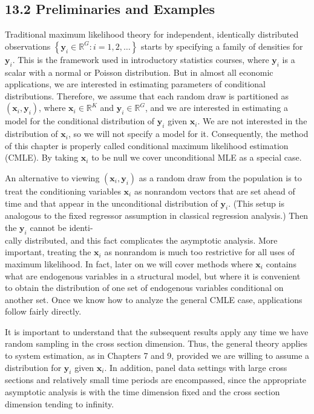 \documentclass[10pt]{article}
\begin{document}
\subsection*{13.2 Preliminaries and Examples}
Traditional maximum likelihood theory for independent, identically distributed observations $\left\{\mathbf{y}_{i} \in \mathbb{R}^{G}: i=1,2, \ldots\right\}$ starts by specifying a family of densities for $\mathbf{y}_{i}$. This is the framework used in introductory statistics courses, where $\mathbf{y}_{i}$ is a scalar with a normal or Poisson distribution. But in almost all economic applications, we are interested in estimating parameters of conditional distributions. Therefore, we assume that each random draw is partitioned as $\left(\mathbf{x}_{i}, \mathbf{y}_{i}\right)$, where $\mathbf{x}_{i} \in \mathbb{R}^{K}$ and $\mathbf{y}_{i} \in \mathbb{R}^{G}$, and we are interested in estimating a model for the conditional distribution of $\mathbf{y}_{i}$ given $\mathbf{x}_{i}$. We are not interested in the distribution of $\mathbf{x}_{i}$, so we will not specify a model for it. Consequently, the method of this chapter is properly called conditional maximum likelihood estimation (CMLE). By taking $\mathbf{x}_{i}$ to be null we cover unconditional MLE as a special case.

An alternative to viewing $\left(\mathbf{x}_{i}, \mathbf{y}_{i}\right)$ as a random draw from the population is to treat the conditioning variables $\mathbf{x}_{i}$ as nonrandom vectors that are set ahead of time and that appear in the unconditional distribution of $\mathbf{y}_{i}$. (This setup is analogous to the fixed regressor assumption in classical regression analysis.) Then the $\mathbf{y}_{i}$ cannot be identi-\\
cally distributed, and this fact complicates the asymptotic analysis. More important, treating the $\mathbf{x}_{i}$ as nonrandom is much too restrictive for all uses of maximum likelihood. In fact, later on we will cover methods where $\mathbf{x}_{i}$ contains what are endogenous variables in a structural model, but where it is convenient to obtain the distribution of one set of endogenous variables conditional on another set. Once we know how to analyze the general CMLE case, applications follow fairly directly.

It is important to understand that the subsequent results apply any time we have random sampling in the cross section dimension. Thus, the general theory applies to system estimation, as in Chapters 7 and 9, provided we are willing to assume a distribution for $\mathbf{y}_{i}$ given $\mathbf{x}_{i}$. In addition, panel data settings with large cross sections and relatively small time periods are encompassed, since the appropriate asymptotic analysis is with the time dimension fixed and the cross section dimension tending to infinity.
\end{document}
